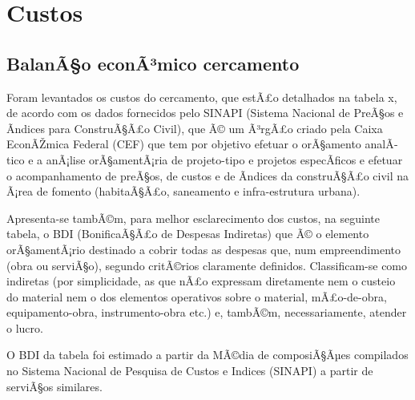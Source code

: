 \chapter{Custos}

\section{BalanÃ§o econÃ³mico cercamento}

 Foram levantados os custos do cercamento, que estÃ£o detalhados na tabela x, de acordo com os dados fornecidos pelo SINAPI (Sistema Nacional de PreÃ§os e Ãndices para ConstruÃ§Ã£o Civil), que Ã© um Ã³rgÃ£o criado pela Caixa EconÃŽmica Federal (CEF) que tem por objetivo efetuar o orÃ§amento analÃ­tico e a anÃ¡lise orÃ§amentÃ¡ria de projeto-tipo e projetos especÃ­ficos e efetuar o acompanhamento de preÃ§os, de custos e de Ã­ndices da construÃ§Ã£o civil na Ã¡rea de fomento (habitaÃ§Ã£o, saneamento e infra-estrutura urbana). 
 
Apresenta-se tambÃ©m, para melhor esclarecimento dos custos, na seguinte tabela, o BDI (BonificaÃ§Ã£o de Despesas Indiretas) que Ã© o elemento orÃ§amentÃ¡rio destinado a cobrir todas as despesas que, num empreendimento (obra ou serviÃ§o), segundo critÃ©rios claramente definidos. Classificam-se como indiretas (por simplicidade, as que nÃ£o expressam diretamente nem o custeio do material nem o dos elementos operativos sobre o material, mÃ£o-de-obra, equipamento-obra, instrumento-obra etc.) e, tambÃ©m, necessariamente, atender o lucro.

O BDI da tabela foi estimado a partir da MÃ©dia de composiÃ§Ãµes compilados no Sistema Nacional de Pesquisa de Custos e Indices (SINAPI) a partir de serviÃ§os similares.



